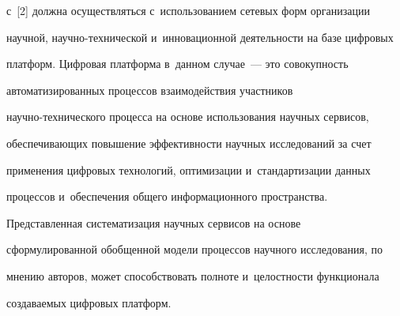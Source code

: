 с~[2] должна осуществляться с~использованием сетевых форм организации 

научной, на\-уч\-но-тех\-ни\-че\-ской и~инновационной деятельности на базе цифровых 

платформ. Цифровая платформа в~данном случае~--- это совокупность 

автоматизированных процессов взаимодействия участников  

на\-уч\-но-тех\-ни\-че\-ско\-го процесса на основе использования научных сервисов, 

обеспечивающих повышение эффективности научных исследований за счет 

применения цифровых технологий, оптимизации и~стандартизации данных 

процессов и~обеспечения общего информационного пространства. 

Представленная систематизация научных сервисов на основе 

сформулированной обобщенной модели процессов научного исследования, по 

мнению авторов, может способствовать полноте и~целостности функционала 

создаваемых циф\-ро\-вых плат\-форм.




     

